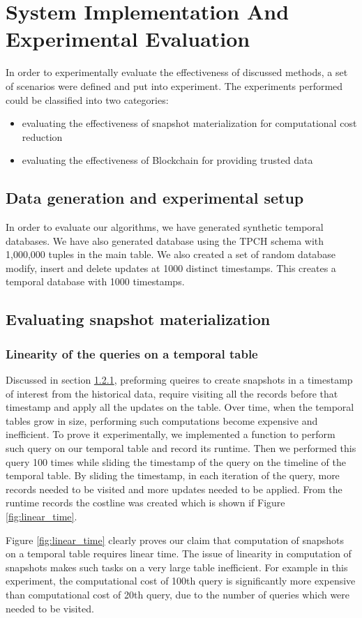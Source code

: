 \chapter{System Implementation And Experimental Evaluation}
In order to experimentally evaluate the effectiveness of discussed methods, a set of scenarios were defined and put into experiment. The experiments performed could be classified into two categories:
\begin{itemize}
	\item evaluating the effectiveness of snapshot materialization for computational cost reduction
	\item evaluating the effectiveness of Blockchain for providing trusted data
\end{itemize} 
\section{Data generation and experimental setup}
In order to evaluate our algorithms, we have generated synthetic temporal databases. We have also generated database using the TPCH schema with 1,000,000 tuples in the main table. We also created a set of random database modify, insert and delete updates at 1000 distinct timestamps. This creates a temporal database with 1000 timestamps.
\section{Evaluating snapshot materialization}
\subsection{Linearity of the queries on a temporal table}
Discussed in section \ref{}, preforming queires to create snapshots in a timestamp of interest from the historical data, require visiting all the records before that timestamp and apply all the updates on the table. Over time, when the temporal tables grow in size, performing such computations become expensive and inefficient. To prove it experimentally, we implemented a function to perform such query on our temporal table and record its runtime. Then we performed this query 100 times while sliding the timestamp of the query on the timeline of the temporal table. By sliding the timestamp, in each iteration of the query, more records needed to be visited and more updates needed to be applied. From the runtime records the costline was created which is shown if Figure \ref{fig:linear_time}. 

Figure \ref{fig:linear_time} clearly proves our claim that computation of snapshots on a temporal table requires linear time. The issue of linearity in computation of snapshots makes such tasks on a very large table inefficient. For example in this experiment, the computational cost of 100th query is significantly more expensive than computational cost of 20th query, due to the number of queries which were needed to be visited.


